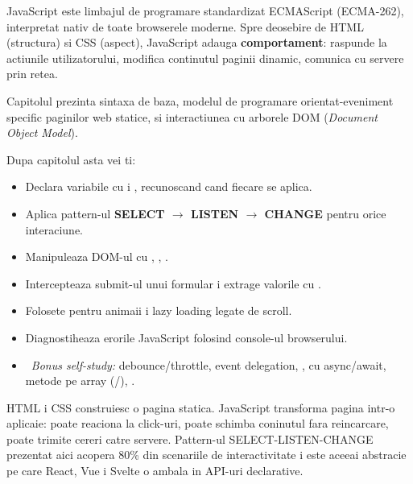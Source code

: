 \clearpage
{}
\setcounter{section}{0}
{}

JavaScript este limbajul de programare standardizat ECMAScript (ECMA-262), interpretat nativ de toate browserele moderne. Spre deosebire de HTML (structura) si CSS (aspect), JavaScript adauga \textbf{comportament}: raspunde la actiunile utilizatorului, modifica continutul paginii dinamic, comunica cu servere prin retea.

Capitolul prezinta sintaxa de baza, modelul de programare orientat-eveniment specific paginilor web statice, si interactiunea cu arborele DOM (\emph{Document Object Model}).

\bigskip

\begin{outcomes}
Dupa capitolul asta vei ti:
\begin{itemize}[itemsep=1pt]
  \item Declara variabile cu  i , recunoscand cand fiecare se aplica.
  \item Aplica pattern-ul \textbf{SELECT $\to$ LISTEN $\to$ CHANGE} pentru orice interaciune.
  \item Manipuleaza DOM-ul cu , , .
  \item Intercepteaza submit-ul unui formular i extrage valorile cu .
  \item Folosete  pentru animaii i lazy loading legate de scroll.
  \item Diagnostiheaza erorile JavaScript folosind console-ul browserului.
  \item \faRocket\ \emph{Bonus self-study:} debounce/throttle, event delegation, ,  cu async/await, metode pe array (/), .
\end{itemize}
\end{outcomes}

\begin{whymatters}
HTML i CSS construiesc o pagina statica. JavaScript transforma pagina intr-o aplicaie: poate reaciona la click-uri, poate schimba coninutul fara reincarcare, poate trimite cereri catre servere. Pattern-ul SELECT-LISTEN-CHANGE prezentat aici acopera 80\% din scenariile de interactivitate i este aceeai abstracie pe care React, Vue i Svelte o ambala in API-uri declarative.
\end{whymatters}

